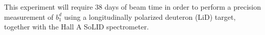 
This experiment will require 38 days of beam time in order to perform a 
precision measurement of $b_1^d$ using a longitudinally polarized deuteron 
(LiD) target, together with the Hall A SoLID spectrometer.



